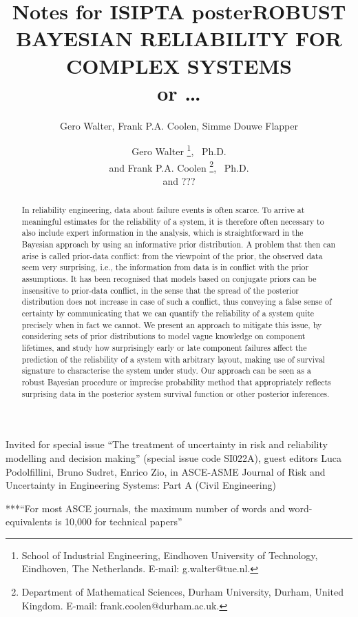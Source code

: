 \documentclass[Journal,SectionNumbers,SingleSpace,InsideFigs]{ascelike}
\title{Notes for ISIPTA poster}
\author{Gero Walter, Frank P.A. Coolen, Simme Douwe Flapper}
\begin{document}
\title{ROBUST BAYESIAN RELIABILITY FOR COMPLEX SYSTEMS\\ or \ldots}

\author{
Gero Walter%
\thanks{
School of Industrial Engineering,
Eindhoven University of Technology, Eindhoven, The Netherlands.
E-mail: g.walter@tue.nl.},
\ Ph.D.
\\
and
Frank P.A. Coolen%
\thanks{
Department of Mathematical Sciences,
Durham University, Durham, United Kingdom.
E-mail: frank.coolen@durham.ac.uk.},
\ Ph.D.
\\
and ???
}

\maketitle

Invited for special issue ``The treatment of uncertainty in risk and reliability modelling and decision making''
(special issue code SI022A), guest editors Luca Podolfillini, Bruno Sudret, Enrico Zio,
in ASCE-ASME Journal of Risk and Uncertainty in Engineering Systems: Part A (Civil Engineering)

***``For most ASCE journals, the maximum number of words and word-equivalents is 10,000 for technical papers''


\begin{abstract}
In reliability engineering, data about failure events is often scarce.
To arrive at meaningful estimates for the reliability of a system,
it is therefore often necessary to also include expert information in the analysis,
which is straightforward in the Bayesian approach by using an informative prior distribution.
%
A problem that then can arise is called prior-data conflict:
from the viewpoint of the prior, the observed data seem very surprising,
i.e., the information from data is in conflict with the prior assumptions.
It has been recognised that models based on conjugate priors can be insensitive to prior-data conflict,
in the sense that the spread of the posterior distribution does not increase in case of such a conflict,
thus conveying a false sense of certainty by communicating that we can quantify the reliability of a system quite precisely when in fact we cannot.
%
We present an approach to mitigate this issue, by considering sets of prior distributions
to model vague knowledge on component lifetimes,
and study how surprisingly early or late component failures
affect the prediction of the reliability of a system with arbitrary layout,
making use of survival signature to characterise the system under study.
Our approach can be seen as a robust Bayesian procedure or imprecise probability method
that appropriately reflects surprising data in the posterior system survival function or other posterior inferences.
\end{abstract}
\end{document}
